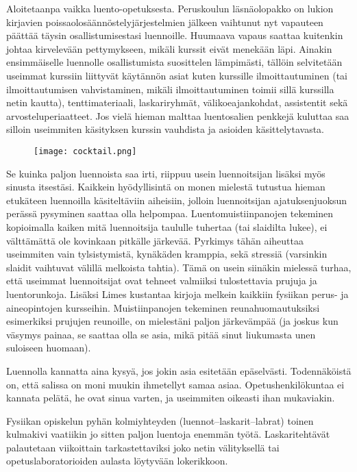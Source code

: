 \documentclass[../ala_hataile.tex]{subfiles}
\begin{document}
	Aloitetaanpa vaikka luento-opetuksesta.
	Peruskoulun läsnä\-olo\-pakko on lukion kirjavien
	poissa\-olo\-säännöstely\-järjestelmien
	jälkeen vaihtunut nyt vapauteen päättää
	täysin osallistumisestasi luennoille. Huumaava
	vapaus saattaa kuitenkin johtaa kirvelevään
	pettymykseen, mikäli kurssit eivät
	menekään läpi. Ainakin ensimmäiselle
	luennolle osallistumista suosittelen lämpimästi,
	tällöin selvitetään useimmat kurssiin
	liittyvät käytännön asiat kuten kurssille ilmoittautuminen
	(tai ilmoittautumisen vahvistaminen,
	mikäli ilmoittautuminen toimii
	sillä kurssilla netin kautta), tentti\-materiaali,
	laskari\-ryhmät, väli\-koe\-ajankohdat, assistentit
	sekä arvosteluperiaatteet. Jos vielä hieman
	malttaa luentosalien penkkejä kuluttaa
	saa silloin useimmiten käsityksen kurssin
	vauhdista ja asioiden käsittelytavasta.
	
	\begin{figure}[h]
		\texttt{[image: cocktail.png]}
	\end{figure}
	Se kuinka paljon luennoista saa irti,
	riippuu usein luennoitsijan lisäksi myös
	sinusta itsestäsi. Kaikkein hyödyllisintä on
	monen mielestä tutustua hieman etukäteen
	luennoilla käsiteltäviin aiheisiin, jolloin luennoitsijan
	ajatuksenjuoksun perässä pysyminen
	saattaa olla helpompaa. Luentomuistiinpanojen
	tekeminen kopioimalla kaiken
	mitä luennoitsija taululle tuhertaa (tai slaidilta
	lukee), ei välttämättä ole kovinkaan
	pitkälle järkevää. Pyrkimys tähän aiheuttaa
	useimmiten vain tylsistymistä, kynäkäden kramppia, sekä stressiä (varsinkin slaidit
	vaihtuvat välillä melkoista tahtia). Tämä on
	usein siinäkin mielessä turhaa, että useimmat
	luennoitsijat ovat tehneet valmiiksi tulostettavia
	prujuja ja luentorunkoja. Lisäksi
	Limes kustantaa kirjoja melkein kaikkiin
	fysiikan perus- ja aineopintojen kursseihin.
	Muistiinpanojen tekeminen reunahuomautuksiksi
	esimerkiksi prujujen reunoille, on
	mielestäni paljon järkevämpää (ja joskus
	kun väsymys painaa, se saattaa olla se asia,
	mikä pitää sinut liukumasta unen suloiseen
	huomaan).
	
	Luennolla kannatta aina kysyä, jos jokin
	asia esitetään epäselvästi. Todennäköistä
	on, että salissa on moni muukin ihmetellyt
	samaa asiaa. Opetushenkilökuntaa ei kannata
	pelätä, he ovat sinua varten, ja useimmiten
	oikeasti ihan mukaviakin.
	
	Fysiikan opiskelun pyhän kolmiyhteyden
	(luennot--laskarit--labrat) toinen kulmakivi
	vaatiikin jo sitten paljon luentoja
	enemmän työtä. Laskaritehtävät palautetaan viikoittain
	tarkastettaviksi joko netin välityksellä tai opetuslaboratorioiden
	aulasta löytyvään lokerikkoon.
	
\end{document}
